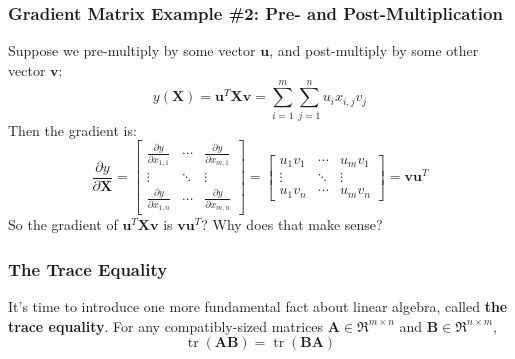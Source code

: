 \documentclass{beamer}
\DeclareMathOperator{\tr}{tr}
\begin{document}
\begin{frame}
  \frametitle{Gradient Matrix Example \#2: Pre- and Post-Multiplication}

  Suppose we pre-multiply by some vector $\mathbf{u}$, and
  post-multiply by some other vector $\mathbf{v}$:
  \begin{displaymath}
    y(\mathbf{X})=\mathbf{u}^T\mathbf{X}\mathbf{v}=
    \sum_{i=1}^m\sum_{j=1}^n u_ix_{i,j}v_j
  \end{displaymath}
  Then the gradient is:
  \begin{displaymath}
    \frac{\partial y}{\partial\mathbf{X}}=
    \left[\begin{array}{ccc}
        \frac{\partial y}{\partial x_{1,1}}&\cdots&\frac{\partial y}{\partial x_{m,1}}\\
        \vdots&\ddots&\vdots\\
        \frac{\partial y}{\partial x_{1,n}}&\cdots&\frac{\partial y}{\partial x_{m,n}}
      \end{array}\right]
    =\left[\begin{array}{ccc}
        u_1v_1&\cdots&u_mv_1\\
        \vdots&\ddots&\vdots\\
        u_1v_n&\cdots&u_mv_n
      \end{array}\right]
    = \mathbf{v}\mathbf{u}^T
  \end{displaymath}
  So the gradient of $\mathbf{u}^T\mathbf{X}\mathbf{v}$ is
  $\mathbf{v}\mathbf{u}^T$?  Why does that make sense?
\end{frame}

\begin{frame}
  \frametitle{The Trace Equality} It's time to introduce one more
  fundamental fact about linear algebra, called \textbf{the trace
    equality}.  For any compatibly-sized matrices
  $\mathbf{A}\in\Re^{m\times n}$ and $\mathbf{B}\in\Re^{n\times m}$,
  \begin{displaymath}
    \tr(\mathbf{AB})=\tr(\mathbf{BA})
  \end{displaymath}
\end{frame}
\end{document}
